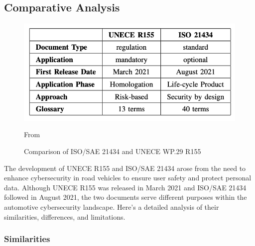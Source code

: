 \subsection{Comparative Analysis}\label{subsec:comparative-analysis}
\begin{figure}[!htb]
    \centering
    \includegraphics[width=0.7\linewidth]{figures/diff-standards}
    \caption{Comparison of ISO/SAE 21434 and UNECE WP.29 R155}
    \footnotesize{From \cite{comparison-standard} }
    \label{fig:comparison}
\end{figure}

The development of UNECE R155 and ISO/SAE 21434 arose from the need to enhance cybersecurity in road vehicles to ensure user safety and protect personal data.
Although UNECE R155 was released in March 2021 and ISO/SAE 21434 followed in August 2021, the two documents serve different purposes within the automotive cybersecurity landscape.
Here’s a detailed analysis of their similarities, differences, and limitations.

\subsubsection{Similarities}

